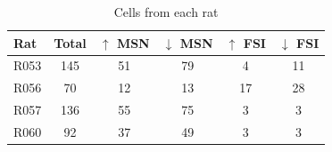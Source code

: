 \documentclass[11pt]{article}
\begin{document}
\begin{table}[p]
\centering
\setlength{\tabcolsep}{1 em} %
\begin{tabular}{l c  c c c c}

Rat                                   & Total        & $\uparrow$ MSN        & $\downarrow$ MSN        & $\uparrow$ FSI       & $\downarrow$ FSI\\
\hline
R053                       & 145         & 51          & 79          & 4         & 11\\
\hline
R056                       & 70         & 12          & 13         & 17          & 28\\
\hline
R057   	          & 136         & 55          & 75          & 3          & 3\\
\hline
R060                       & 92         & 37          & 49          & 3          & 3\\
\hline   

\end{tabular}
\caption {Cells from each rat} \label{tbl1} 
\end{table}
\end{document}
